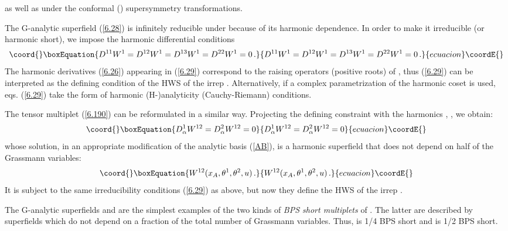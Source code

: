\documentclass[a4paper,11pt]{article}
\begin{document}
as well as under the conformal (\coordHE{}) supersymmetry transformations.

The G-analytic superfield (\ref{6.28}) is infinitely reducible under
\coordHE{} because of its harmonic dependence. In order to make it
irreducible (or harmonic short), we impose the harmonic differential conditions
\begin{equation}\coord{}\boxEquation{\label{6.29}
   D^{11}W^{1} = D^{12}W^{1} = D^{13}W^{1} = D^{22}W^{1} = 0\,.
}{D^{11}W^{1} = D^{12}W^{1} = D^{13}W^{1} = D^{22}W^{1} = 0\,.
}{ecuacion}\coordE{}\end{equation}
The harmonic derivatives (\ref{6.26}) appearing in (\ref{6.29})
correspond to the raising operators (positive roots) of
\coordHE{}, thus (\ref{6.29}) can be interpreted as the
defining condition of the HWS of the irrep \myHighlight{$[1,0]$}\coordHE{}. Alternatively,
if a complex parametrization of the harmonic coset
\coordHE{} is used, eqs.
(\ref{6.29}) take the form of harmonic (H-)analyticity
(Cauchy-Riemann) conditions.

The tensor multiplet (\ref{6.190}) can be reformulated in a similar way.
Projecting the defining constraint with the harmonics \coordHE{},
\coordHE{}, we obtain:
\begin{equation}\coord{}\boxEquation{\label{6.270}
D^1_\alpha W^{12} = D^2_\alpha W^{12}= 0
}{D^1_\alpha W^{12} = D^2_\alpha W^{12}= 0
}{ecuacion}\coordE{}\end{equation}
whose solution, in an appropriate modification of the analytic basis
(\ref{AB}), is a harmonic superfield that does not depend on half of the
Grassmann variables:
\begin{equation}\coord{}\boxEquation{\label{6.280}
W^{12}(x_A,\theta^1,\theta^2,u) \, .
}{W^{12}(x_A,\theta^1,\theta^2,u) \, .
}{ecuacion}\coordE{}\end{equation}
It is subject to the same \coordHE{} irreducibility conditions
(\ref{6.29}) as \coordHE{} above, but now they define the HWS of the irrep \myHighlight{$[0,1]$}\coordHE{}.

The G-analytic superfields \coordHE{} and
\coordHE{} are the simplest examples of the two kinds of {\it
BPS short multiplets} of  \coordHE{}. The latter are described by
superfields which do not depend on a fraction of the total number of Grassmann
variables. Thus, \coordHE{} is 1/4 BPS short and \coordHE{} is 1/2 BPS short.
\end{document}
